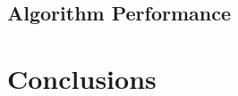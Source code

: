 \documentclass[11pt]{article}
\begin{document}
\subsection{Algorithm Performance}
\label{subsec:performance}

\section{Conclusions}
\label{sec:conclusion}



 

\appendix
\end{document}
